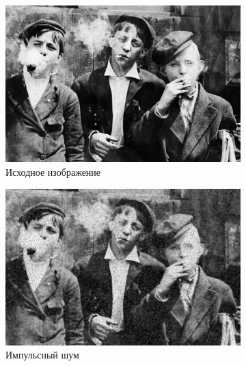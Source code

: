 \begin{figure}[ht!] 
    \centering
    \begin{subfigure}[b]{0.5\linewidth}
        \centering
        \includegraphics[width=0.95\linewidth]{../lewis-hine-taschen-main-3.jpg} 
        \caption{Исходное изображение} 
        \label{wiener_5:a} 
        \vspace{4ex}
    \end{subfigure}%
    \begin{subfigure}[b]{0.5\linewidth}
      \centering
      \includegraphics[width=0.95\linewidth]{../Wiener_Filter/Wiener_Impulse_noise_(k=5).jpg} 
      \caption{Импульсный шум} 
      \label{weiner_5:b} 
      \vspace{4ex}
    \end{subfigure}
    \begin{subfigure}[b]{0.5\linewidth}
      \centering

\end{subfigure}
\end{figure}
